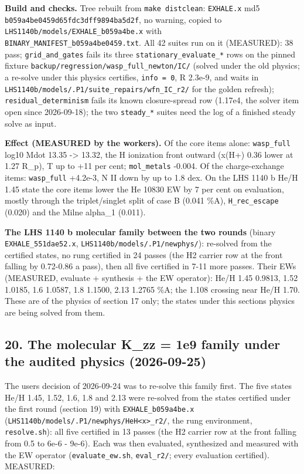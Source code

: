 \documentclass[english,a4paper]{my_memo}
\begin{document}
\textbf{Build and checks.} Tree rebuilt from \texttt{make\ distclean}: \texttt{EXHALE.x} md5
\texttt{b059a4be0459d65fdc3dff9894ba5d2f}, no warning, copied to
\texttt{LHS1140b/models/EXHALE\_b059a4be.x} with \texttt{BINARY\_MANIFEST\_b059a4be0459.txt}.
All 42 suites run on it (MEASURED): 38 pass; \texttt{grid\_and\_gates} fails its three
\texttt{stationary\_evaluate\_*} rows on the pinned fixture
\texttt{backup/regression/wasp\_full\_newton/IC/} (solved under the old physics; a
re-solve under this physics certifies, \texttt{info\ =\ 0}, \textbar\textbar R\textbar\textbar{} 2.3e-9, and waits in
\texttt{LHS1140b/models/.P1/suite\_repairs/wfn\_IC\_r2/} for the golden refresh);
\texttt{residual\_determinism} fails its known closure-spread row (1.17e4, the
solver item open since 2026-09-18); the two \texttt{steady\_*} suites need the log of
a finished steady solve as input.

\textbf{Effect (MEASURED by the workers).} Of the core items alone: \texttt{wasp\_full}
log10 Mdot 13.35 -\textgreater{} 13.32, the H ionization front outward (x(H+) 0.36 lower
at 1.27 R\_p), T up to +11 per cent; \texttt{mol\_metals} -0.004. Of the
charge-exchange items: \texttt{wasp\_full} +4.2e-3, N II down by up to 1.8 dex. On
the LHS 1140 b He/H 1.45 state the core items lower the He 10830 EW by 7 per
cent on evaluation, mostly through the triplet/singlet split of case B
(0.041 \%A), \texttt{H\_rec\_escape} (0.020) and the Milne alpha\_1 (0.011).

\textbf{The LHS 1140 b molecular family between the two rounds} (binary
\texttt{EXHALE\_551dae52.x}, \texttt{LHS1140b/models/.P1/newphys/}): re-solved from the
certified states, no rung certified in 24 passes (the H2 carrier row at the
front falling by 0.72-0.86 a pass), then all five certified in 7-11 more
passes. Their EWs (MEASURED, evaluate + synthesis + the EW operator): He/H
1.45 0.9813, 1.52 1.0185, 1.6 1.0587, 1.8 1.1500, 2.13 1.2765 \%A; the 1.108
crossing near He/H 1.70. These are of the physics of section 17 only; the
states under this section\textquotesingle s physics are being solved from them.

\subsection{20. The molecular K\_zz = 1e9 family under the audited physics (2026-09-25)}\label{20-the-molecular-k_zz--1e9-family-under-the-audited-physics-2026-09-25}

The user\textquotesingle s decision of 2026-09-24 was to re-solve this family first. The
five states He/H 1.45, 1.52, 1.6, 1.8 and 2.13 were re-solved from the
states certified under the first round (section 19) with
\texttt{EXHALE\_b059a4be.x} (\texttt{LHS1140b/models/.P1/newphys/HeH\textless{}x\textgreater{}\_r2/}, the rung
environment, \texttt{resolve.sh}): all five certified in 13 passes (the H2 carrier
row at the front falling from 0.5 to 6e-6 - 9e-6). Each was then evaluated,
synthesized and measured with the EW operator (\texttt{evaluate\_ew.sh},
\texttt{eval\_r2/}; every evaluation certified). MEASURED:
\end{document}
